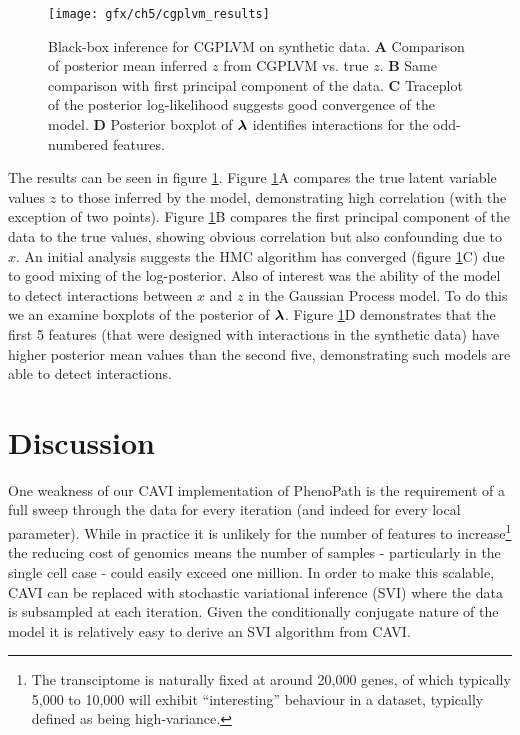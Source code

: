 \begin{figure}
  \centering
\texttt{[image: gfx/ch5/cgplvm\_results]}
\caption{Black-box inference for CGPLVM on synthetic data.
\textbf{A} Comparison of posterior mean inferred $z$ from CGPLVM vs. true $z$. %
\textbf{B} Same comparison with first principal component of the data. %
\textbf{C} Traceplot of the posterior log-likelihood suggests good convergence of the model.
\textbf{D} Posterior boxplot of $\bm{\lambda}$ identifies interactions for the odd-numbered features.
} \label{fig:cgplvm_results}
\end{figure}

The results can be seen in figure \ref{fig:cgplvm_results}. Figure \ref{fig:cgplvm_results}A compares the true latent variable values $z$ to those inferred by the model, demonstrating high correlation (with the exception of two points). Figure \ref{fig:cgplvm_results}B compares the first principal component of the data to the true values, showing obvious correlation but also confounding due to $x$. An initial analysis suggests the HMC algorithm has converged (figure \ref{fig:cgplvm_results}C) due to good mixing of the log-posterior. Also of interest was the ability of the model to detect interactions between $x$ and $z$ in the Gaussian Process model. To do this we an examine boxplots of the posterior of $\bm{\lambda}$. Figure \ref{fig:cgplvm_results}D demonstrates that the first 5 features (that were designed with interactions in the synthetic data) have higher posterior mean values than the second five, demonstrating such models are able to detect interactions.


\section{Discussion}

One weakness of our CAVI implementation of PhenoPath is the requirement of a full sweep through the data for every iteration (and indeed for every local parameter). While in practice it is unlikely for the number of features to increase\footnote{The transciptome is naturally fixed at around 20,000 genes, of which typically 5,000 to 10,000 will exhibit ``interesting'' behaviour in a dataset, typically defined as being high-variance.} the reducing cost of genomics means the number of samples - particularly in the single cell case - could easily exceed one million. In order to make this scalable, CAVI can be replaced with stochastic variational inference (SVI) \cite{hoffman2013stochastic} where the data is subsampled at each iteration. Given the conditionally conjugate nature of the model it is relatively easy to derive an SVI algorithm from CAVI.

